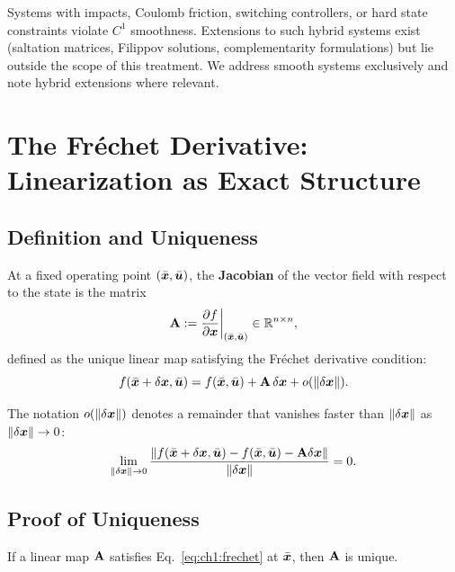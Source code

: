 \begin{warningbox}
Systems with impacts, Coulomb friction, switching controllers, or hard state constraints
violate $C^1$ smoothness. Extensions to such hybrid systems exist (saltation matrices,
Filippov solutions, complementarity formulations) but lie outside the scope of this
treatment. We address smooth systems exclusively and note hybrid extensions where relevant.
\end{warningbox}


\section{The Fréchet Derivative: Linearization as Exact Structure}

\subsection{Definition and Uniqueness}

At a fixed operating point $(\bar{\bm{x}}, \bar{\bm{u}})$, the \textbf{Jacobian} of the vector
field with respect to the state is the matrix
\begin{equation}
\mathbf{A} := \frac{\partial f}{\partial \bm{x}}\bigg|_{(\bar{\bm{x}},\bar{\bm{u}})} \in \mathbb{R}^{n\times n},
\label{eq:ch1:jacobian-A}
\end{equation}
defined as the unique linear map satisfying the Fréchet derivative condition:
\begin{equation}
f(\bar{\bm{x}} + \delta\bm{x}, \bar{\bm{u}})
= f(\bar{\bm{x}}, \bar{\bm{u}}) + \mathbf{A}\,\delta\bm{x} + o(\left\lVert \delta\bm{x} \right\rVert).
\label{eq:ch1:frechet}
\end{equation}

The notation $o(\left\lVert \delta\bm{x} \right\rVert)$ denotes a remainder that vanishes faster than $\left\lVert \delta\bm{x} \right\rVert$
as $\left\lVert \delta\bm{x} \right\rVert\to 0$:
\begin{equation}
\lim_{\left\lVert \delta\bm{x} \right\rVert\to 0}
\frac{\left\lVert f(\bar{\bm{x}}+\delta\bm{x},\bar{\bm{u}}) - f(\bar{\bm{x}},\bar{\bm{u}}) - \mathbf{A}\delta\bm{x} \right\rVert}{\left\lVert \delta\bm{x} \right\rVert} = 0.
\label{eq:ch1:frechet-limit}
\end{equation}

\subsection{Proof of Uniqueness}

\begin{proposition}\label{prop:frechet-unique}
If a linear map $\mathbf{A}$ satisfies Eq.~\eqref{eq:ch1:frechet} at $\bar{\bm{x}}$, then $\mathbf{A}$
is unique.
\end{proposition}

